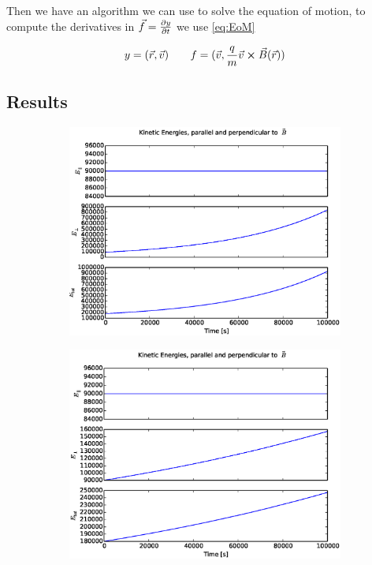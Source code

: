 \documentclass[x11names]{article}
\renewcommand{\va}{\vec}
\begin{document}
    Then we have an algorithm we can use to solve the equation of motion, to compute the derivatives in \(\va{f} = \pdv{y}{t}\) we use \cref{eq:EoM} 

    \begin{align}
      y = ( \va{r}, \va{v} )
      \qquad
      f = ( \va{v}, \frac{q}{m} \va{ v }\cross \va{B}(\va{r})  )
    \end{align}


\subsection{Results}
    
    \begin{figure} 
      \begin{subfigure}{0.45\textwidth}
        \includegraphics[width = \textwidth]{figures/energyEuler_simple8-3}
      \end{subfigure}
      \begin{subfigure}{0.45\textwidth}
        \includegraphics[width = \textwidth]{figures/energyVerlet_simple8-3}

\end{subfigure}
\end{figure}
\end{document}
